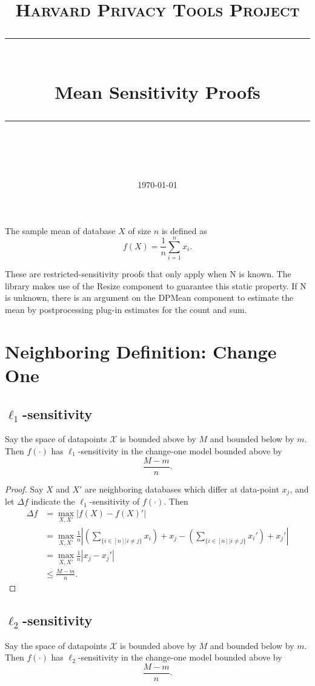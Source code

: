 \documentclass[11pt]{scrartcl} %
\title{
	\normalfont\normalsize
	\textsc{Harvard Privacy Tools Project}\\ %
	\vspace{25pt} %
	\rule{\linewidth}{0.5pt}\\ %
	\vspace{20pt} %
	{\huge Mean Sensitivity Proofs}\\ %
	\vspace{12pt} %
	\rule{\linewidth}{2pt}\\ %
	\vspace{12pt} %
}
\date{\normalsize\today} %
\begin{document}
\maketitle

\begin{definition}
The sample mean of database $X$ of size $n$ is defined as 
$$f(X) = \frac{1}{n} \sum_{i=1}^n x_i.$$
\end{definition}
These are restricted-sensitivity proofs that only apply when N is known.
The library makes use of the Resize component to guarantee this static property.
If N is unknown, there is an argument on the DPMean component to estimate the mean by postprocessing plug-in estimates for the count and sum.

\section{Neighboring Definition: Change One}

\subsection{$\ell_1$-sensitivity}
\begin{theorem}
Say the space of datapoints $\mathcal{X}$ is bounded above by $M$ and bounded below by $m$. Then $f(\cdot)$ has $\ell_1$-sensitivity in the change-one model bounded above by
$$ \frac{M-m}{n}.$$
\end{theorem}

\begin{proof}
Say $X$ and $X'$ are neighboring databases which differ at data-point $x_j$, and let $\Delta{f}$ indicate the $\ell_1$-sensitivity of $f(\cdot)$. Then
\begin{align*}
\Delta{f} &= \max_{X,X'} \left\vert f(X) - f(X)' \right\vert \\
	&=  \max_{X,X'} \frac{1}{n} \left\vert \left(\sum_{\{ i \in [n] \vert i \ne j\}} x_i\right) + x_j  - \left(\sum_{\{ i \in [n] \vert i \ne j\}} x_i'\right) + x_j'  \right\vert \\
	&= \max_{X,X'} \frac{1}{n} \left\vert x_j - x_j' \right\vert \\
	&\le \frac{M-m}{n}.
\end{align*}
\end{proof}

\subsection{$\ell_2$-sensitivity}
\begin{theorem}
	Say the space of datapoints $\mathcal{X}$ is bounded above by $M$ and bounded below by $m$.
	Then $f(\cdot)$ has $\ell_2$-sensitivity in the change-one model bounded above by
	 $$ \frac{M-m}{n}. $$
\end{theorem}
\end{document}
